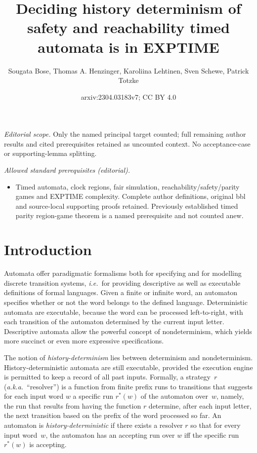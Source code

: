 \documentclass[10pt,a4paper]{amsart}
\title{Deciding history determinism of safety and reachability timed automata is in EXPTIME}
\author{Sougata Bose, Thomas A. Henzinger, Karoliina Lehtinen, Sven Schewe, Patrick Totzke}
\date{arxiv:2304.03183v7; CC BY 4.0}
\theoremstyle{definition}
\numberwithin{equation}{section}
\begin{document}
\maketitle
\noindent\textit{Editorial scope.} Only the named principal target counted; full remaining author results and cited prerequisites retained as uncounted context. No acceptance-case or supporting-lemma splitting.\par\medskip
\noindent\textit{Allowed standard prerequisites (editorial).}\begin{itemize}
\item Timed automata, clock regions, fair simulation, reachability/safety/parity games and EXPTIME complexity. Complete author definitions, original bbl and source-local supporting proofs retained. Previously established timed parity region-game theorem is a named prerequisite and not counted anew.
\end{itemize}\medskip
	\section{Introduction}
	\label{sec:intro}


Automata offer paradigmatic formalisms both for specifying and for modelling
discrete transition systems,
\emph{i.e.}~for providing descriptive as well as executable definitions of
formal languages.
Given a finite or infinite word, an automaton specifies whether or not the
word belongs to the defined language.
Deterministic automata are executable, because the word can be processed
left-to-right, with each transition of the automaton determined by
the current input letter.
Descriptive automata allow the powerful concept of nondeterminism, which
yields more succinct or even more expressive specifications.

The notion of \emph{history-determinism} lies between determinism and
nondeterminism.
History-deterministic automata are still executable, provided the execution
engine is permitted to keep a record of all past inputs. 
Formally, a strategy~$r$ (\emph{a.k.a.}~``resolver'') is a function from
finite prefix runs to transitions that suggests for each input word $w$
a specific run $r^*(w)$ of the automaton over~$w$,
namely, the run that results from having the function $r$ determine, after
each input letter, the next transition based on the prefix of the word
processed so far.
An automaton is \emph{history-deterministic} if there exists a resolver $r$
so that for every input word~$w$, the automaton has an accepting run over
$w$ iff the specific run $r^*(w)$ is accepting.
\end{document}
